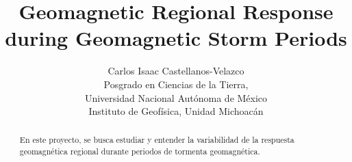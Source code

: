 \documentclass[preprint,12pt]{article}
\title{Geomagnetic Regional Response during Geomagnetic Storm Periods}
\author{%
	Carlos Isaac Castellanos-Velazco \\ Posgrado en Ciencias de la Tierra, \\ Universidad Nacional Aut\'onoma de M\'exico \\ Instituto de Geofísica, Unidad Michoacán%
}
\begin{document}
\maketitle











\begin{abstract}
En este proyecto, se busca estudiar y entender la variabilidad de la respuesta geomagnética regional durante periodos de tormenta geomagnética.
\end{abstract}
\end{document}
